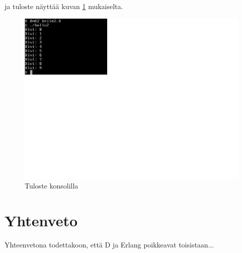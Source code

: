 \documentclass[11pt,oneside,a4paper]{article}
\begin{document}
ja tuloste näyttää kuvan \ref{konsoli1} mukaiselta.
\begin{figure}[tbh]
\begin{center}
\includegraphics[width=1.0\textwidth]{konsoli1.jpg}
\caption{Tuloste konsolilla}
\label{konsoli1}
\end{center}
\end{figure}

\section{Yhtenveto}
Yhteenvetona todettakoon, että D ja Erlang poikkeavat toisistaan...
\end{document}
